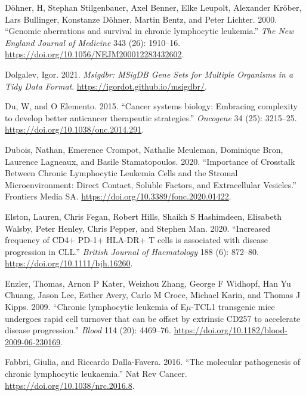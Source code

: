 \documentclass[11pt, a4paper, twosided]{book}
\newenvironment{CSLReferences}%
  {}%
  {\par}
\begin{document}
\begin{CSLReferences}{1}{0}
\leavevmode{}%
Döhner, H, Stephan Stilgenbauer, Axel Benner, Elke Leupolt, Alexander Kröber, Lars Bullinger, Konstanze Döhner, Martin Bentz, and Peter Lichter. 2000. {``{Genomic aberrations and survival in chronic lymphocytic leukemia.}''} \emph{The New England Journal of Medicine} 343 (26): 1910--16. \url{https://doi.org/10.1056/NEJM200012283432602}.

\leavevmode{}%
Dolgalev, Igor. 2021. \emph{Msigdbr: MSigDB Gene Sets for Multiple Organisms in a Tidy Data Format}. \url{https://igordot.github.io/msigdbr/}.

\leavevmode{}%
Du, W, and O Elemento. 2015. {``{Cancer systems biology: Embracing complexity to develop better anticancer therapeutic strategies}.''} \emph{Oncogene} 34 (25): 3215--25. \url{https://doi.org/10.1038/onc.2014.291}.

\leavevmode{}%
Dubois, Nathan, Emerence Crompot, Nathalie Meuleman, Dominique Bron, Laurence Lagneaux, and Basile Stamatopoulos. 2020. {``{Importance of Crosstalk Between Chronic Lymphocytic Leukemia Cells and the Stromal Microenvironment: Direct Contact, Soluble Factors, and Extracellular Vesicles}.''} Frontiers Media SA. \url{https://doi.org/10.3389/fonc.2020.01422}.

\leavevmode{}%
Elston, Lauren, Chris Fegan, Robert Hills, Shaikh S Hashimdeen, Elisabeth Walsby, Peter Henley, Chris Pepper, and Stephen Man. 2020. {``{Increased frequency of CD4+ PD-1+ HLA-DR+ T cells is associated with disease progression in CLL.}''} \emph{British Journal of Haematology} 188 (6): 872--80. \url{https://doi.org/10.1111/bjh.16260}.

\leavevmode{}%
Enzler, Thomas, Arnon P Kater, Weizhou Zhang, George F Widhopf, Han Yu Chuang, Jason Lee, Esther Avery, Carlo M Croce, Michael Karin, and Thomas J Kipps. 2009. {``{Chronic lymphocytic leukemia of E\(\mu\)-TCL1 transgenic mice undergoes rapid cell turnover that can be offset by extrinsic CD257 to accelerate disease progression}.''} \emph{Blood} 114 (20): 4469--76. \url{https://doi.org/10.1182/blood-2009-06-230169}.

\leavevmode{}%
Fabbri, Giulia, and Riccardo Dalla-Favera. 2016. {``{The molecular pathogenesis of chronic lymphocytic leukaemia}.''} Nat Rev Cancer. \url{https://doi.org/10.1038/nrc.2016.8}.


\end{CSLReferences}
\end{document}
